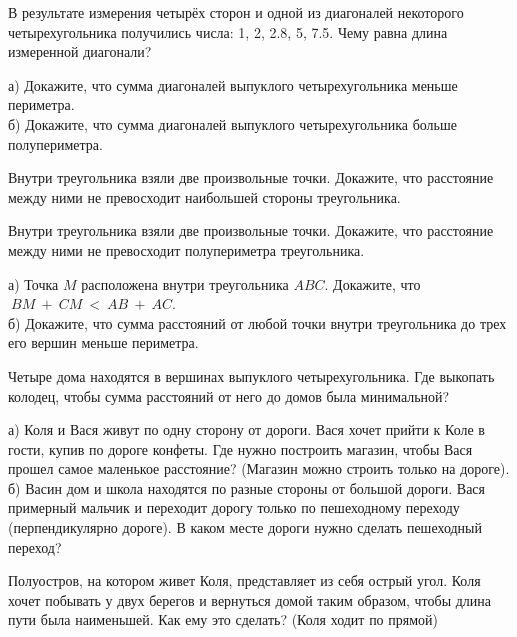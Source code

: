 \begin{problems}
 
\item В результате измерения четырёх сторон и одной из диагоналей некоторого четырехугольника получились числа: 1, 2, 2.8, 5, 7.5.
Чему равна длина измеренной диагонали?

\item а) Докажите, что сумма диагоналей выпуклого четырехугольника меньше периметра.\\
б) Докажите, что сумма диагоналей выпуклого четырехугольника больше полупериметра.

\item Внутри треугольника взяли две произвольные точки. Докажите, что расстояние между ними не превосходит наибольшей стороны треугольника.

\item Внутри треугольника взяли две произвольные точки. Докажите, что расстояние между ними не превосходит полупериметра треугольника. 

\item а) Точка $M$ расположена внутри треугольника $ABC$. Докажите, что \\ $~BM~+~CM~<~AB~+~AC$. \\
б) Докажите, что сумма расстояний от любой точки внутри треугольника до трех его вершин меньше периметра.

\item Четыре дома находятся в вершинах выпуклого четырехугольника. Где выкопать колодец, чтобы сумма расстояний от него до домов была минимальной? 

\item а) Коля и Вася живут по одну сторону от дороги. Вася хочет прийти к Коле в гости, купив по дороге конфеты. Где нужно построить магазин, чтобы Вася прошел самое маленькое расстояние? (Магазин можно строить только на дороге).\\
б) Васин дом и школа находятся по разные стороны от большой дороги. Вася примерный мальчик и переходит дорогу только по пешеходному переходу (перпендикулярно дороге). В каком месте дороги нужно сделать пешеходный переход?

\item Полуостров, на котором живет Коля, представляет из себя острый угол. Коля хочет побывать у двух берегов и вернуться домой таким образом, чтобы длина пути была наименьшей. Как ему это сделать? (Коля ходит по прямой)


\end{problems}
